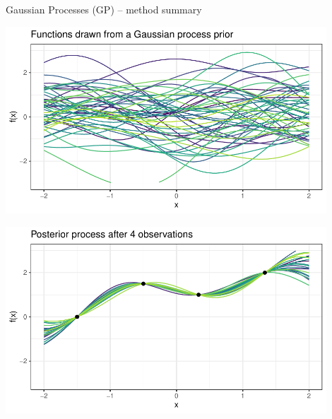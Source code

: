 \begin{frame}{Gaussian Processes (GP) -- method summary}
\begin{minipage}[b]{0.5\textwidth}
  \centering
  \includegraphics[width=0.9\textwidth]{figure/gp-prior} \\
\end{minipage}%
\begin{minipage}[b]{0.5\textwidth}
\centering
  \includegraphics[width=0.9\textwidth]{figure/gp-posterior}
\end{minipage}

\end{frame}


